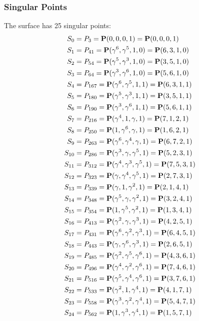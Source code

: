 \documentclass{article}
\newcommand{\bP}{{\bf P}}
\begin{document}
{\subsubsection*{Singular Points}
The surface has 25 singular points:\\
\begin{align*}
S_{0} &= P_{3}=\bP(0, 0, 0, 1) = \bP(0, 0, 0, 1)\\
S_{1} &= P_{41}=\bP(\gamma^{6}, \gamma^{5}, 1, 0) = \bP(6, 3, 1, 0)\\
S_{2} &= P_{54}=\bP(\gamma^{5}, \gamma^{3}, 1, 0) = \bP(3, 5, 1, 0)\\
S_{3} &= P_{64}=\bP(\gamma^{3}, \gamma^{6}, 1, 0) = \bP(5, 6, 1, 0)\\
S_{4} &= P_{167}=\bP(\gamma^{6}, \gamma^{5}, 1, 1) = \bP(6, 3, 1, 1)\\
S_{5} &= P_{180}=\bP(\gamma^{5}, \gamma^{3}, 1, 1) = \bP(3, 5, 1, 1)\\
S_{6} &= P_{190}=\bP(\gamma^{3}, \gamma^{6}, 1, 1) = \bP(5, 6, 1, 1)\\
S_{7} &= P_{216}=\bP(\gamma^{4}, 1, \gamma , 1) = \bP(7, 1, 2, 1)\\
S_{8} &= P_{250}=\bP(1, \gamma^{6}, \gamma , 1) = \bP(1, 6, 2, 1)\\
S_{9} &= P_{263}=\bP(\gamma^{6}, \gamma^{4}, \gamma , 1) = \bP(6, 7, 2, 1)\\
S_{10} &= P_{286}=\bP(\gamma^{3}, \gamma , \gamma^{5}, 1) = \bP(5, 2, 3, 1)\\
S_{11} &= P_{312}=\bP(\gamma^{4}, \gamma^{3}, \gamma^{5}, 1) = \bP(7, 5, 3, 1)\\
S_{12} &= P_{323}=\bP(\gamma , \gamma^{4}, \gamma^{5}, 1) = \bP(2, 7, 3, 1)\\
S_{13} &= P_{339}=\bP(\gamma , 1, \gamma^{2}, 1) = \bP(2, 1, 4, 1)\\
S_{14} &= P_{348}=\bP(\gamma^{5}, \gamma , \gamma^{2}, 1) = \bP(3, 2, 4, 1)\\
S_{15} &= P_{354}=\bP(1, \gamma^{5}, \gamma^{2}, 1) = \bP(1, 3, 4, 1)\\
S_{16} &= P_{413}=\bP(\gamma^{2}, \gamma , \gamma^{3}, 1) = \bP(4, 2, 5, 1)\\
S_{17} &= P_{431}=\bP(\gamma^{6}, \gamma^{2}, \gamma^{3}, 1) = \bP(6, 4, 5, 1)\\
S_{18} &= P_{443}=\bP(\gamma , \gamma^{6}, \gamma^{3}, 1) = \bP(2, 6, 5, 1)\\
S_{19} &= P_{485}=\bP(\gamma^{2}, \gamma^{5}, \gamma^{6}, 1) = \bP(4, 3, 6, 1)\\
S_{20} &= P_{496}=\bP(\gamma^{4}, \gamma^{2}, \gamma^{6}, 1) = \bP(7, 4, 6, 1)\\
S_{21} &= P_{516}=\bP(\gamma^{5}, \gamma^{4}, \gamma^{6}, 1) = \bP(3, 7, 6, 1)\\
S_{22} &= P_{533}=\bP(\gamma^{2}, 1, \gamma^{4}, 1) = \bP(4, 1, 7, 1)\\
S_{23} &= P_{558}=\bP(\gamma^{3}, \gamma^{2}, \gamma^{4}, 1) = \bP(5, 4, 7, 1)\\
S_{24} &= P_{562}=\bP(1, \gamma^{3}, \gamma^{4}, 1) = \bP(1, 5, 7, 1)\\
\end{align*}
}
\end{document}
